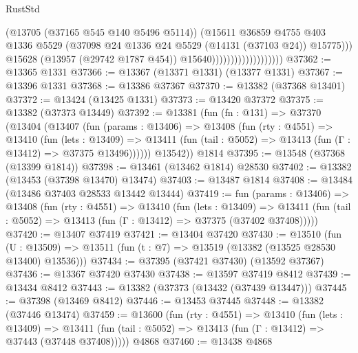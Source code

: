 \begin{lexlean}{RustStd}
\begin{coremodule}
                                            (@13705 (@37165 @545 @140 @5496 @5114))
                                            (@15611
                                              @36859
                                              @4755
                                              @403
                                              @1336
                                              @5529
                                              (@37098
                                                @24
                                                @1336
                                                @24
                                                @5529
                                                (@14131 (@37103 @24))
                                                @15775)))
                                          @15628
                                          (@13957 (@29742 @1787 @454))
                                          @15640)))))))))))))))))))
@37362 := @13365 @1331
@37366 := @13367 (@13371 @1331) (@13377 @1331)
@37367 := @13396 @1331
@37368 := @13386 @37367
@37370 := @13382 (@37368 @13401)
@37372 := @13424 (@13425 @1331)
@37373 := @13420 @37372
@37375 := @13382 (@37373 @13449)
@37392 := @13381
    (fun (fn : @131) =>
    @37370
      (@13404
        (@13407
          (fun (params : @13406) =>
          @13408
            (fun (rty : @4551) =>
            @13410
              (fun (lets : @13409) =>
              @13411 (fun (tail : @5052) => @13413 (fun (Γ : @13412) => @37375 @13496))))))
        @13542))
    @1814
@37395 := @13548 (@37368 (@13399 @1814))
@37398 := @13461 (@13462 @1814) @28530
@37402 := @13382 (@13453 (@37398 @13470) @13474)
@37403 := @13487 @1814
@37408 := @13484 (@13486 @37403 @28533 @13442 @13444)
@37419 := fun (params : @13406) =>
  @13408
    (fun (rty : @4551) =>
    @13410
      (fun (lets : @13409) =>
      @13411 (fun (tail : @5052) => @13413 (fun (Γ : @13412) => @37375 (@37402 @37408)))))
@37420 := @13407 @37419
@37421 := @13404 @37420
@37430 := @13510
    (fun (U : @13509) => @13511 (fun (t : @7) => @13519 (@13382 (@13525 @28530 @13400) @13536)))
@37434 := @37395 (@37421 @37430) (@13592 @37367)
@37436 := @13367 @37420 @37430
@37438 := @13597 @37419 @8412
@37439 := @13434 @8412
@37443 := @13382 (@37373 (@13432 (@37439 @13447)))
@37445 := @37398 (@13469 @8412)
@37446 := @13453 @37445
@37448 := @13382 (@37446 @13474)
@37459 := @13600
    (fun (rty : @4551) =>
    @13410
      (fun (lets : @13409) =>
      @13411 (fun (tail : @5052) => @13413 (fun (Γ : @13412) => @37443 (@37448 @37408)))))
    @4868
@37460 := @13438 @4868

\end{coremodule}
\end{lexlean}
